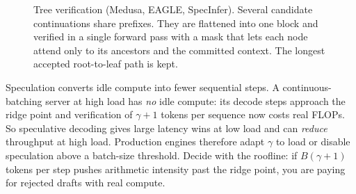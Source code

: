 \begin{figure}[t]
\centering
{}
\caption{Tree verification (Medusa, EAGLE, SpecInfer). Several candidate continuations
share prefixes. They are flattened into one block and verified in a single forward pass
with a mask that lets each node attend only to its ancestors and the committed context.
The longest accepted root-to-leaf path is kept.}
\label{fig:efficient:tree}
\end{figure}

\begin{systemslens}
Speculation converts idle compute into fewer sequential steps. A continuous-batching
server at high load has \emph{no} idle compute: its decode steps approach the ridge
point and verification of $\gamma+1$ tokens per sequence now costs real FLOPs. So
speculative decoding gives large latency wins at low load and can \emph{reduce}
throughput at high load. Production engines therefore adapt $\gamma$ to load or disable
speculation above a batch-size threshold. Decide with the roofline: if
$B(\gamma+1)$ tokens per step pushes arithmetic intensity past the ridge point, you are
paying for rejected drafts with real compute.
\end{systemslens}

